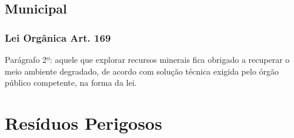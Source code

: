 \begin{subapend}
	\subsection{Municipal}
	\begin{subsubapend}
		\item \subsubsection{Lei Orgânica Art. 169}
		 Parágrafo 2º: aquele que explorar recursos minerais fica obrigado a recuperar o meio ambiente degradado, de acordo com solução técnica exigida pelo órgão público competente, na forma da lei.
	\end{subsubapend}
\end{subapend}

\section{Resíduos Perigosos}

